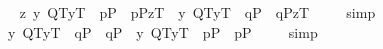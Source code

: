 \begin{isabellebody}
\ \isamarkupfalse%
\ {\isachardoublequoteopen}{\isacharbrackleft}{\isacharparenleft}\isactrlbold {\isasymforall}z{\isachardot}\ {\isasymlparr}{\isacharparenleft}\isactrlbold {\isasymlambda}y{\isachardot}\ {\isacharparenleft}{\isasymlparr}Q\isactrlsup T{\isacharcomma}y\isactrlsup T{\isasymrparr}\ \isactrlbold {\isasymand}\ {\isacharparenleft}p\isactrlsup P\ \isactrlbold {\isasymor}\ \isactrlbold {\isasymnot}p\isactrlsup P{\isacharparenright}{\isacharparenright}{\isacharparenright}{\isacharcomma}z\isactrlsup T{\isasymrparr}\ \isactrlbold {\isasymequiv}\ {\isasymlparr}{\isacharparenleft}\isactrlbold {\isasymlambda}y{\isachardot}\ {\isacharparenleft}{\isasymlparr}Q\isactrlsup T{\isacharcomma}y\isactrlsup T{\isasymrparr}\ \isactrlbold {\isasymand}\ {\isacharparenleft}q\isactrlsup P\ \isactrlbold {\isasymor}\ \isactrlbold {\isasymnot}q\isactrlsup P{\isacharparenright}{\isacharparenright}{\isacharparenright}{\isacharcomma}z\isactrlsup T{\isasymrparr}{\isacharparenright}{\isacharbrackright}\ {\isacharequal}\ {\isasymtop}{\isachardoublequoteclose}%
\isadelimproof
\ %
\endisadelimproof
%
\isatagproof
{}\isamarkupfalse%
\ simp\ \isamarkupfalse%
%
\endisatagproof
{\isafoldproof}%
%
\isadelimproof
%
\endisadelimproof
\isanewline
\ \isamarkupfalse%
\ {\isachardoublequoteopen}{\isacharbrackleft}{\isacharparenleft}\isactrlbold {\isasymlambda}y{\isachardot}\ {\isacharparenleft}{\isasymlparr}Q\isactrlsup T{\isacharcomma}y\isactrlsup T{\isasymrparr}\ \isactrlbold {\isasymand}\ {\isacharparenleft}q\isactrlsup P\ \isactrlbold {\isasymor}\ \isactrlbold {\isasymnot}q\isactrlsup P{\isacharparenright}{\isacharparenright}{\isacharparenright}\ \isactrlbold {\isacharequal}\ {\isacharparenleft}\isactrlbold {\isasymlambda}y{\isachardot}\ {\isacharparenleft}{\isasymlparr}Q\isactrlsup T{\isacharcomma}y\isactrlsup T{\isasymrparr}\ \isactrlbold {\isasymand}\ {\isacharparenleft}p\isactrlsup P\ \isactrlbold {\isasymor}\ \isactrlbold {\isasymnot}p\isactrlsup P{\isacharparenright}{\isacharparenright}{\isacharparenright}{\isacharbrackright}\ {\isacharequal}\ {\isasymtop}{\isachardoublequoteclose}%
\isadelimproof
\ %
\endisadelimproof
%
\isatagproof
{}\isamarkupfalse%
\ simp\ \isamarkupfalse%
%
\endisatagproof
{\isafoldproof}%
%
\isadelimproof
%
\endisadelimproof
\isanewline
\ \isamarkupfalse%

\end{isabellebody}
